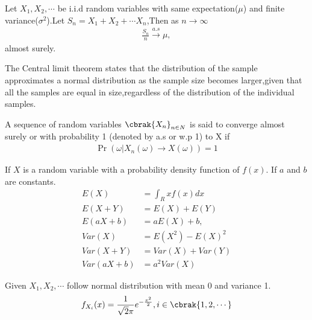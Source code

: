      \begin{theorem}
    \label{conv/6/theorem1}
    Let $X_1,X_2,\cdots $ be i.i.d random variables with same expectation($\mu$) and finite variance($\sigma^2$).Let $S_{n}=X_1+X_2+\cdots X_n$,Then as $n \to \infty$
    \begin{align}
        \frac{S_n}{n} \xrightarrow{a.s}  \mu,
    \end{align}
    almost surely.
    \end{theorem}
    \begin{theorem}
    \label{conv/6/theorem3}
    The Central limit theorem states that the distribution of the sample approximates a normal distribution as the sample size becomes larger,given that all the samples are equal in size,regardless of the distribution of the individual samples.\label{conv/6/central}
    \end{theorem}
    \begin{definition}
    A sequence of random variables $\cbrak{X_n}_{n\in N}$ is said to converge almost surely or with probability 1 (denoted by a.s or w.p 1) to X if \label{conv/6/with prob 1}
    \begin{align}
        \Pr(\omega |X_n(\omega) \to X(\omega))=1
    \end{align}
    \end{definition}
    \begin{lemma}
    If $X$ is a random variable with a probability density function of $f(x)$. If $a$ and $b$ are constants.
    \begin{align}
        \label{conv/6/1}
        E(X)&=\int_R xf(x)dx\\ 
        \label{conv/6/2}
        E(X+Y)&=E(X)+E(Y)\\    
        \label{conv/6/3}
        E(aX+b)&=aE(X)+b, \\   
        \label{conv/6/4}
        Var(X)&=E(X^2)-{E(X)}^2\\  
        \label{conv/6/5}
        Var(X+Y)&=Var(X)+Var(Y)\\  
        \label{conv/6/6}
        Var(aX+b)&=a^2 Var(X)
        
    \end{align}
    \end{lemma}
    Given $X_1,X_2, \cdots$ follow normal distribution with mean 0 and variance 1.
    \begin{align}
        f_{X_i}(x)=\frac{1}{\sqrt{2}\pi}e^{-\frac{x^2}{2}} ,i \in \cbrak{1,2,\cdots}
    \end{align}
